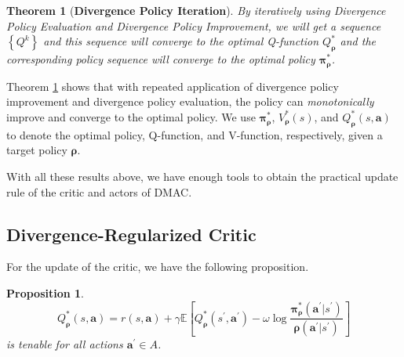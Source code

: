 \documentclass{article}
\newtheorem{theorem}{Theorem}
\newtheorem{proposition}{Proposition}
\begin{document}
\begin{theorem}[{\bf Divergence Policy Iteration}] \label{policy_iteration}
	By iteratively using Divergence Policy Evaluation and Divergence Policy Improvement, we will get a sequence $\left\{ Q^{k} \right\}$ and this sequence will converge to the optimal Q-function $Q_{\bm{\rho}}^{*}$ and the corresponding policy sequence will converge to the optimal policy $\bm{\pi}^{*}_{\bm{\rho}}$.
\end{theorem}

Theorem \ref{policy_iteration} shows that with repeated application of divergence policy improvement and divergence policy evaluation, the policy can \textit{monotonically} improve and converge to the optimal policy. We use ${\bm{\pi}}^*_{\bm{\rho}}$, $V_{\bm{\rho}}^*(s)$, and $Q_{\bm{\rho}}^{*}(s,\bm{a})$ to denote the optimal policy, Q-function, and V-function, respectively, given a target policy ${\bm{\rho}}$.

With all these results above, we have enough tools to obtain the practical update rule of the critic and actors of DMAC.


\subsection{Divergence-Regularized Critic}

For the update of the critic, we have the following proposition.
\begin{proposition} \label{Q_coro}
    \[Q^*_{\bm{\rho}}(s,\bm{a}) = r(s,\bm{a}) + \gamma \mathbb{E}\left[ Q^*_{\bm{\rho}}(s^{\prime},\bm{a}^{\prime}) - \omega \log \frac{{\bm{\pi}^*_{\bm{\rho}}}(\bm{a}^{\prime}|s^{\prime})}{{\bm{\rho}}(\bm{a}^{\prime}|s^{\prime})}  \right] \]
	is tenable for all actions $\bm{a}^{\prime} \in A$.
\end{proposition} 
\iffalse
\[Q^*_{\bm{\rho}}(s,\bm{a}) = r(s,\bm{a}) + \gamma \mathbb{E}_{s^\prime \sim P(\cdot|s, \bm{a}), \bm{a}^\prime \sim \bm{\pi}^*_{\bm{\rho}}(\cdot | s^\prime ) }\left[ Q^*_{\bm{\rho}}(s^{\prime},\bm{a}^{\prime}) - \omega \log \frac{{\bm{\pi}^*_{\bm{\rho}}}(\bm{a}^{\prime}|s^{\prime})}{{\bm{\rho}}(\bm{a}^{\prime}|s^{\prime})}  \right] \]
\fi
	
\end{document}
